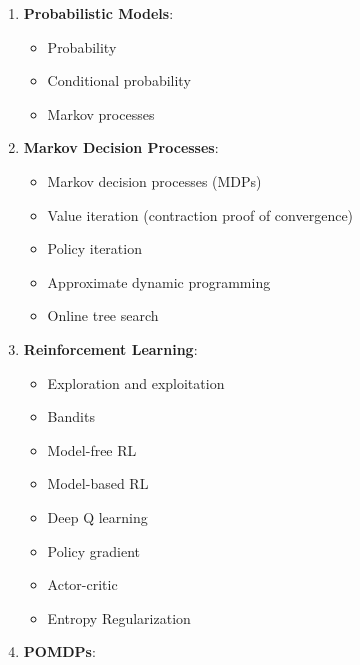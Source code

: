 \documentclass[9pt]{article}
\begin{document}
\begin{enumerate}[noitemsep]
    \item \textbf{Probabilistic Models}:
        \begin{multicols}{2}
            \begin{itemize}[noitemsep]
                \item Probability
                \item Conditional probability
                \item Markov processes
            \end{itemize}
        \end{multicols}
    \item \textbf{Markov Decision Processes}:
        \begin{multicols}{2}
        \begin{itemize}[noitemsep]
            \item Markov decision processes (MDPs)
            \item Value iteration (contraction proof of convergence)
            \item Policy iteration
            \item Approximate dynamic programming
            \item Online tree search
        \end{itemize}
        \end{multicols}
    \item \textbf{Reinforcement Learning}:
        \begin{multicols}{2}
        \begin{itemize}[noitemsep]
            \item Exploration and exploitation
            \item Bandits
            \item Model-free RL
            \item Model-based RL
            \item Deep Q learning
            \item Policy gradient
            \item Actor-critic
            \item Entropy Regularization
        \end{itemize}
        \end{multicols}
    \item \textbf{POMDPs}:
        \begin{multicols}{2}
        \begin{itemize}[noitemsep]

\end{itemize}
\end{multicols}
\end{enumerate}
\end{document}
